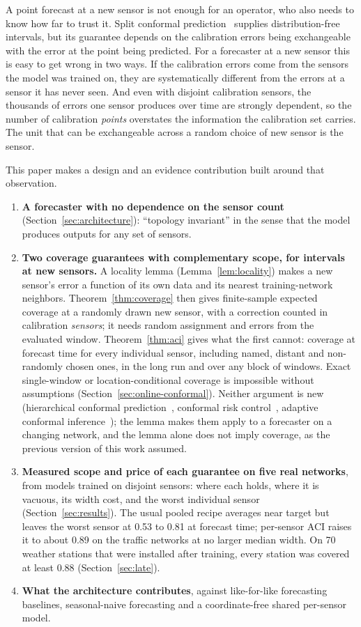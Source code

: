 \documentclass[journal,twoside,web]{ieeecolor}
\begin{document}
A point forecast at a new sensor is not enough for an operator, who also needs to know how far to
trust it. Split conformal prediction~\cite{vovk2005algorithmic,angelopoulos2023conformal} supplies
distribution-free intervals, but its guarantee depends on the calibration errors being exchangeable
with the error at the point being predicted. For a forecaster at a new sensor this is easy to get
wrong in two ways. If the calibration errors come from the sensors the model was trained on, they are
systematically different from the errors at a sensor it has never seen. And even with disjoint
calibration sensors, the thousands of errors one sensor produces over time are strongly dependent,
so the number of calibration \emph{points} overstates the information the calibration set carries.
The unit that can be exchangeable across a random choice of new sensor is the sensor.

This paper makes a design and an evidence contribution built around that observation.
\begin{enumerate}
\item \textbf{A forecaster with no dependence on the sensor count}
(Section~\ref{sec:architecture}): ``topology invariant'' in the sense that the model produces outputs for any
set of sensors.
\item \textbf{Two coverage guarantees with complementary scope, for intervals at new sensors.} A locality lemma
(Lemma~\ref{lem:locality}) makes a new sensor's error a function of its own data and its nearest
training-network neighbors. Theorem~\ref{thm:coverage} then gives finite-sample expected coverage at a randomly
drawn new sensor, with a correction counted in calibration \emph{sensors}; it needs random assignment and errors
from the evaluated window. Theorem~\ref{thm:aci} gives what the first cannot: coverage at forecast time for every
individual sensor, including named, distant and non-randomly chosen ones, in the long run and over any block of
windows. Exact single-window or location-conditional coverage is impossible without assumptions
(Section~\ref{sec:online-conformal}). Neither argument is new (hierarchical conformal
prediction~\cite{lee2023hcp}, conformal risk control~\cite{crc2024}, adaptive conformal
inference~\cite{gibbs2021aci}); the lemma makes them apply to a forecaster on a changing network, and the lemma
alone does not imply coverage, as the previous version of this work assumed.
\item \textbf{Measured scope and price of each guarantee on five real networks}, from models trained on disjoint
sensors: where each holds, where it is vacuous, its width cost, and the worst individual sensor
(Section~\ref{sec:results}). The usual pooled recipe averages near target but leaves the worst sensor at 0.53 to
0.81 at forecast time; per-sensor ACI raises it to about 0.89 on the traffic networks at no larger median width. On 70 weather
stations that were installed after training, every station was covered at least 0.88 (Section~\ref{sec:late}).
\item \textbf{What the architecture contributes}, against like-for-like forecasting baselines, seasonal-naive
forecasting and a coordinate-free shared per-sensor model.
\end{enumerate}
\end{document}
